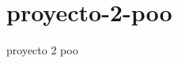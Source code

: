 \chapter{proyecto-\/2-\/poo }
\hypertarget{md__r_e_a_d_m_e}{}\label{md__r_e_a_d_m_e}
\label{md__r_e_a_d_m_e_autotoc_md0}%
%


proyecto 2 poo 